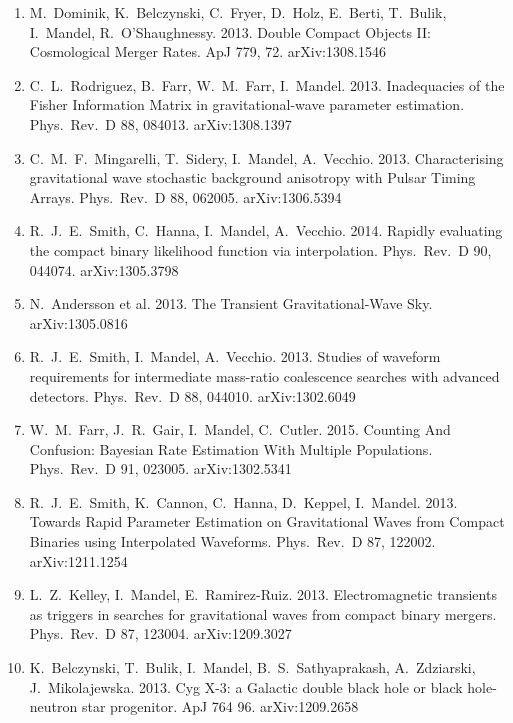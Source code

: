 \documentclass[margin,line]{res}
\begin{document}
\begin{resume}
\begin{enumerate}
\item  M.~Dominik, K.~Belczynski, C.~Fryer, D.~Holz, E.~Berti, T.~Bulik, I.~Mandel, R.~O'Shaughnessy. 2013.  Double Compact Objects II: Cosmological Merger Rates.  ApJ 779, 72. arXiv:1308.1546

\item  C.~L.~Rodriguez, B.~Farr, W.~M.~Farr, I.~Mandel.  2013.  Inadequacies of the Fisher Information Matrix in gravitational-wave parameter estimation.  Phys.~Rev.~D 88, 084013.  arXiv:1308.1397 

\item  C.~M.~F.~Mingarelli, T.~Sidery, I.~Mandel, A.~Vecchio.  2013.  Characterising gravitational wave stochastic background anisotropy with Pulsar Timing Arrays.  Phys.~Rev.~D 88, 062005. arXiv:1306.5394

\item  R.~J.~E.~Smith, C.~Hanna, I.~Mandel, A.~Vecchio.  2014.  Rapidly evaluating the compact binary likelihood function via interpolation.  Phys.~Rev.~D 90, 044074. arXiv:1305.3798

\item  N.~Andersson et al.  2013.  The Transient Gravitational-Wave Sky.  arXiv:1305.0816

\item  R.~J.~E.~Smith, I.~Mandel, A.~Vecchio. 2013.  Studies of waveform requirements for intermediate mass-ratio coalescence searches with advanced detectors. Phys.~Rev.~D 88, 044010.  arXiv:1302.6049

\item  W.~M.~Farr, J.~R.~Gair, I.~Mandel, C.~Cutler.  2015.  Counting And Confusion: Bayesian Rate Estimation With Multiple Populations.  Phys.~Rev.~D 91, 023005. arXiv:1302.5341

\item  R.~J.~E.~Smith, K.~Cannon, C.~Hanna, D.~Keppel, I.~Mandel. 2013. Towards Rapid Parameter Estimation on Gravitational Waves from Compact Binaries using Interpolated Waveforms.  Phys.~Rev.~D 87, 122002.  arXiv:1211.1254

\item  L.~Z.~Kelley, I.~Mandel, E.~Ramirez-Ruiz. 2013.  Electromagnetic transients as triggers in searches for gravitational waves from compact binary mergers. Phys.~Rev.~D 87, 123004.  arXiv:1209.3027

\item  K.~Belczynski, T.~Bulik, I.~Mandel, B.~S.~Sathyaprakash, A.~Zdziarski, J.~Mikolajewska. 2013. Cyg X-3: a Galactic double black hole or black hole-neutron star progenitor. ApJ 764 96. arXiv:1209.2658


\end{enumerate}
\end{resume}
\end{document}
